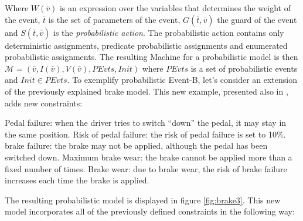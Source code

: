 Where $W( \bar{v})$ is an expression over the variables that determines the weight of the event, $\bar{t}$ is the set of parameters of the event, $G(\bar{t}, \bar{v})$ the guard of the event and $S(\bar{t}, \bar{v})$ is the \textit{probabilistic action}. The probabilistic action contains only deterministic assignments, predicate probabilistic assignments and enumerated probabilistic assignments. The resulting Machine for a probabilistic model is then $\mathscr{M} =(\bar{v}, I(\bar{v}), V(\bar{v}), PEvts, Init)$ where $PEvts$ is a set of probabilistic events and $Init \in PEvts$. To exemplify probabilistic Event-B, let's consider an extension of the previously explained brake model. This new example, presented also in \cite{Aouadhi2017}, adds new constraints:
\begin{itemize}
    \itema Pedal failure: when the driver tries to switch “down” the pedal, it may stay in the same position.
    \itemb Risk of pedal failure: the risk of pedal failure is set to 10\%.
    \itemc brake failure: the brake may not be applied, although the pedal has been switched down.
    \itemd Maximum brake wear: the brake cannot be applied more than a fixed number of times.
    \iteme Brake wear: due to brake wear, the risk of brake failure increases each time the brake is applied.
\end{itemize}
The resulting probabilistic model is displayed in figure \ref{fig:brake3}. This new model incorporates all of the previously defined constraints in the following way:
